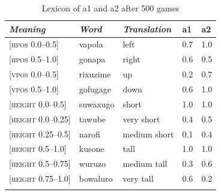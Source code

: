 \begin{table}
\begin{center}
\begin{tabular}{ l  l  l  l  l }
\lsptoprule
{\itshape Meaning}&{\itshape Word}&{\itshape Translation} & {\bfshape  a1}&{\bfshape  a2} \\ \midrule
{}[\textsc{hpos} 0.0–0.5]&vapola&left &0.7&1.0\\ 
{}[\textsc{hpos} 0.5–1.0]&gonapa&right &0.6&0.5\\ 
{}[\textsc{vpos} 0.0–0.5]&rixuzime& up & 0.2&0.7\\ 
{}[\textsc{vpos} 0.5–1.0]&gofugage& down &0.6&1.0\\ 
{}[\textsc{height} 0.0–0.5]&suwaxugo&short & 1.0&1.0\\ 
{}[\textsc{height} 0.0–0.25]&tawube&very short & 0.4&0.5\\ 
{}[\textsc{height} 0.25–0.5]&narofi&medium short&0.1&0.4\\ 
{}[\textsc{height} 0.5–1.0]&kusone&tall&1.0&1.0\\ 
{}[\textsc{height} 0.5–0.75]&wuruzo&medium tall&0.3&0.6\\ 
{}[\textsc{height} 0.75–1.0]&bowaluro&very tall&0.6&0.2\\ 
\lspbottomrule
\end{tabular}
\caption{\label{tab:lex500a}Lexicon of {\bfshape  a1} and {\bfshape  a2} after 500 games}
\end{center}
\end{table}




